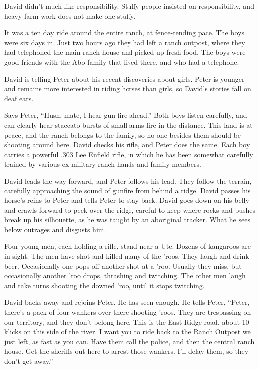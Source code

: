 David didn't much like responsibility.  Stuffy people insisted on responsibility, and heavy farm work does not make one stuffy.

It was a ten day ride around the entire ranch, at fence-tending pace.  The boys were six days in.  Just two hours ago they had left a ranch outpost, where they had telephoned the main ranch house and picked up fresh food.  The boys were good friends with the Abo family that lived there, and who had a telephone.

David is telling Peter about his recent discoveries about girls.  Peter is younger and remains more interested in riding horses than girls, so David's stories fall on deaf ears.

Says Peter, ``Hush, mate, I hear gun fire ahead.''   Both boys listen carefully, and can clearly hear staccato bursts of small arms fire in the distance.  This land is at peace, and the ranch belongs to the family, so no one besides them should be shooting around here.  David checks his rifle, and Peter does the same.  Each boy carries a powerful .303 Lee Enfield rifle, in which he has been somewhat carefully trained by various ex-military ranch hands and family members.

David leads the way forward, and Peter follows his lead.  They follow the terrain, carefully approaching the sound of gunfire from behind a ridge.  David passes his horse's reins to Peter and tells Peter to stay back.  David goes down on his belly and crawls forward to peek over the ridge, careful to keep where rocks and bushes break up his silhouette, as he was taught by an aboriginal tracker.  What he sees below outrages and disgusts him.

Four young men, each holding a rifle, stand near a Ute.  Dozens of kangaroos are in sight.  The men have shot and killed many of the 'roos.  They laugh and drink beer.  Occasionally one pops off another shot at a 'roo.  Usually they miss, but occasionally another 'roo drops, thrashing and twitching.  The other men laugh and take turns shooting the downed 'roo, until it stops twitching.

David backs away and rejoins Peter.  He has seen enough.  He tells Peter, ``Peter, there's a pack of four wankers over there shooting 'roos.  They are trespassing on our territory, and they don't belong here.  This is the East Ridge road, about 10 klicks on this side of the river.  I want you to ride back to the Ranch Outpost we just left, as fast as you can.  Have them call the police, and then the central ranch house.  Get the sheriffs out here to arrest those wankers.  I'll delay them, so they don't get away.''

